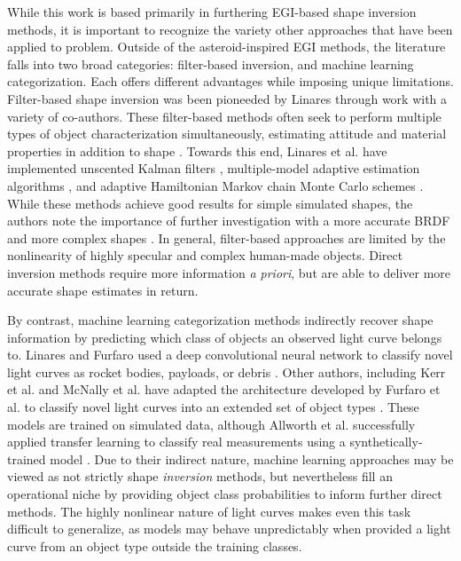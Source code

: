While this work is based primarily in furthering EGI-based shape inversion methods, it is important to recognize the variety other approaches that have been applied to problem. Outside of the asteroid-inspired EGI methods, the literature falls into two broad categories: filter-based inversion, and machine learning categorization. Each offers different advantages while imposing unique limitations. Filter-based shape inversion was been pioneeded by Linares through work with a variety of co-authors. These filter-based methods often seek to perform multiple types of object characterization simultaneously, estimating attitude and material properties in addition to shape \cite{linares2012, linares2014space, linares2018space}. Towards this end, Linares et al. have implemented unscented Kalman filters \cite{linares2012}, multiple-model adaptive estimation algorithms \cite{linares2014space}, and adaptive Hamiltonian Markov chain Monte Carlo schemes \cite{linares2018space}. While these methods achieve good results for simple simulated shapes, the authors note the importance of further investigation with a more accurate BRDF and more complex shapes \cite{linares2018space}. In general, filter-based approaches are limited by the nonlinearity of highly specular and complex human-made objects. Direct inversion methods require more information \textit{a priori}, but are able to deliver more accurate shape estimates in return.

By contrast, machine learning categorization methods indirectly recover shape information by predicting which class of objects an observed light curve belongs to. Linares and Furfaro used a deep convolutional neural network to classify novel light curves as rocket bodies, payloads, or debris \cite{linares2016}. Other authors, including Kerr et al. and McNally et al. have adapted the architecture developed by Furfaro et al. to classify novel light curves into an extended set of object types \cite{kerr2021, mcnally2021}. These models are trained on simulated data, although Allworth et al. successfully applied transfer learning to classify real measurements using a synthetically-trained model \cite{allworth2021}. Due to their indirect nature, machine learning approaches may be viewed as not strictly shape \textit{inversion} methods, but nevertheless fill an operational niche by providing object class probabilities to inform further direct methods. The highly nonlinear nature of light curves makes even this task difficult to generalize, as models may behave unpredictably when provided a light curve from an object type outside the training classes.

